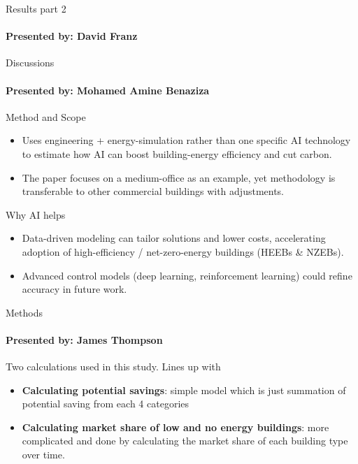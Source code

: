 \documentclass{beamer}
\begin{document}
\begin{frame}{Results part 2}
\framesubtitle{Presented by: David Franz}


\end{frame}

\begin{frame}{Discussions}
\framesubtitle{Presented by: Mohamed Amine Benaziza}

Method and Scope
\begin{itemize}
    \item Uses engineering + energy-simulation rather than one specific AI technology to estimate how AI can boost building-energy efficiency and cut carbon.
    \item The paper focuses on a medium-office as an example, yet methodology is transferable to other commercial buildings with adjustments.
\end{itemize}
\pause %
Why AI helps
\begin{itemize}[<+->] %
    \item Data-driven modeling can tailor solutions and lower costs, accelerating adoption of high-efficiency / net-zero-energy buildings (HEEBs \& NZEBs).
    \item Advanced control models (deep learning, reinforcement learning) could refine accuracy in future work.
\end{itemize}

\end{frame}

\begin{frame}{Methods}
\framesubtitle{Presented by: James Thompson}

Two calculations used in this study. Lines up with 
\pause
\begin{itemize}[<+->]
    \item \textbf{Calculating potential savings}: simple model which is just summation of potential saving from each 4 categories
    \item \textbf{Calculating market share of low and no energy buildings}: more complicated and done by calculating the market share of each building type over time.
\end{itemize}
\end{frame}
\end{document}
